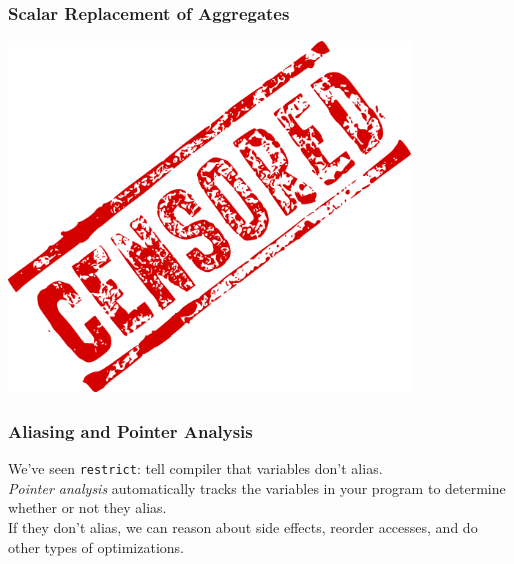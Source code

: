 \documentclass[aspectratio=43]{beamer}
\newenvironment{changemargin}[1]{%
  \begin{list}{}{%
    \setlength{\topsep}{0pt}%
    \setlength{\leftmargin}{#1}%
    \setlength{\rightmargin}{1em}
    \setlength{\listparindent}{\parindent}%
    \setlength{\itemindent}{\parindent}%
    \setlength{\parsep}{\parskip}%
  }%
  \item[]}{\end{list}}
\begin{document}
\begin{frame}[fragile]
  \frametitle{Scalar Replacement of Aggregates}

\begin{center}
  \includegraphics[width=0.8\textwidth]{L29/Censored_rubber_stamp.png}
\end{center}
\end{frame}

\begin{frame}
  \frametitle{Aliasing and Pointer Analysis}

  \begin{changemargin}{1.5cm}

     We've seen {\tt restrict}: tell compiler that variables don't
      alias.\\[1em]

    {\it Pointer analysis} automatically tracks the variables in your program to
      determine whether or not they alias.\\[1em]
    
    If they don't alias, we can reason about side effects, reorder
    accesses, and do other types of optimizations.
  \end{changemargin}

\end{frame}
\end{document}
